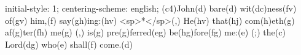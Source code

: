 initial-style: 1;
centering-scheme: english;
(c4)John(d) bare(d) wit(dc)ness(fv) of(gv) him,(f) say(gh)ing:(hv) <sp>*</sp>(,) He(hv) that(hj) com(h)eth(g) af(g)ter(fh) me(g) (,) is(g) pre(g)ferred(eg) be(hg)fore(fg) me:(e) (;) the(c) Lord(dg) who(e) shall(f) come.(d)
